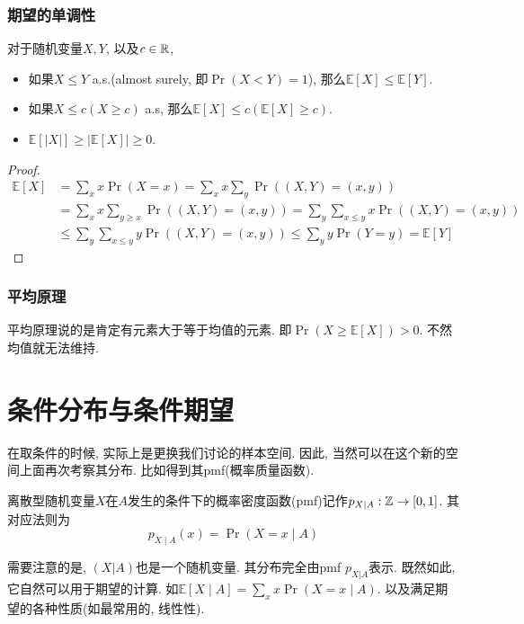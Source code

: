 \documentclass{ctexart}
\begin{document}
\subsubsection{期望的单调性} 对于随机变量$X, Y$, 以及$c \in \mathbb R$, 
\begin{itemize}
    \item 如果$X\leq Y$ a.s.(almost surely, 即$\Pr(X<Y)=1$), 那么$\mathbb{E}[X] \leq \mathbb{E}[Y]$.
    \item 如果$X\leq c(X\geq c)$ a.s, 那么$\mathbb{E}[X] \leq c(\mathbb{E}[X] \geq c)$.
    \item $\mathbb{E}[|X|] \geq|\mathbb{E}[X]| \geq 0$.
\end{itemize}

\begin{proof}
    $$
\begin{aligned}
\mathbb{E}[X] & =\sum_x x \operatorname{Pr}(X=x)=\sum_x x \sum_y \operatorname{Pr}((X, Y)=(x, y)) \\
& =\sum_x x \sum_{y \geq x} \operatorname{Pr}((X, Y)=(x, y))=\sum_y \sum_{x \leq y} x \operatorname{Pr}((X, Y)=(x, y)) \\
& \leq \sum_y \sum_{x \leq y} y \operatorname{Pr}((X, Y)=(x, y)) \leq \sum_y y \operatorname{Pr}(Y=y)=\mathbb{E}[Y]
\end{aligned}
$$
\end{proof}

\subsubsection{平均原理} 平均原理说的是肯定有元素大于等于均值的元素. 即$\operatorname{Pr}(X \geq \mathbb{E}[X])>0$. 不然均值就无法维持. 

\section{条件分布与条件期望}

在取条件的时候, 实际上是更换我们讨论的样本空间. 因此, 当然可以在这个新的空间上面再次考察其分布. 比如得到其pmf(概率质量函数). 

\begin{definition}[条件分布]
    离散型随机变量$X$在$A$发生的条件下的概率密度函数(pmf)记作$p_{X|A}:{\mathbb Z}\to [0,1]$. 其对应法则为
    $$
p_{X \mid A}(x)=\operatorname{Pr}(X=x \mid A)
$$

\end{definition}

需要注意的是, $(X|A)$也是一个随机变量. 其分布完全由pmf $p_{X|A}$表示. 既然如此, 它自然可以用于期望的计算. 如$\mathbb{E}[X \mid A]=\sum_x x \operatorname{Pr}(X=x \mid A)$. 以及满足期望的各种性质(如最常用的, 线性性). 
\end{document}
